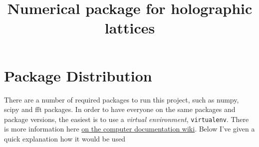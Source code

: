 \documentclass[a4paper,12pt]{article}
\begin{document}
\title{\textbf{Numerical package for holographic lattices}}
\date{}




\section{Package Distribution}
There are a number of required packages to run this project, such as numpy, scipy and fft packages. In order to have everyone on the same packages and package versions, the easiest is to use a \emph{virtual environment}, \texttt{virtualenv}. There is more information here \href{https://helpdesk.lorentz.leidenuniv.nl/wiki/doku.php?id=working_with_python}{on the computer documentation wiki}. Below I've given a quick explanation how it would be used
\end{document}
